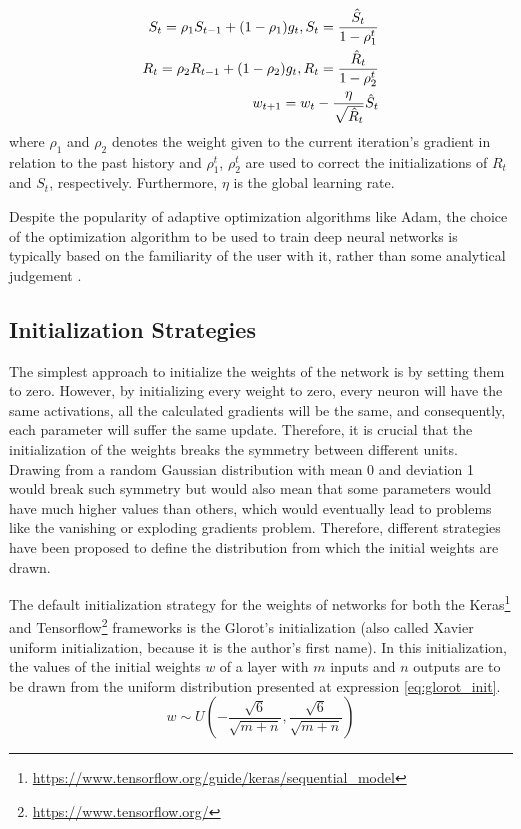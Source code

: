     \begin{equation}
        \centering
        \begin{split}
            S_t = \rho_1 S_{t-1} + (1-\rho_1)g_t, S_t = \frac{\hat{S}_t}{1-\rho^t_1}\\
            R_t = \rho_2 R_{t-1} + (1-\rho_2)g_t, R_t = \frac{\hat{R}_t}{1-\rho^t_2}\\
            w_{t+1} = w_t - \frac{\eta}{\sqrt{\hat{R}_t}} \hat{S}_t  
        \end{split}
        \label{eq:adam}
    \end{equation}  
    where $\rho_1$ and $\rho_2$ denotes the weight given to the current iteration’s gradient in relation to the past history and $\rho_1^t$, $\rho_2^t$ are used to correct the initializations of $R_t$ and $S_t$, respectively. Furthermore, $\eta$ is the global learning rate. \par
    
    Despite the popularity of adaptive optimization algorithms like Adam, the choice of the optimization algorithm to be used to train deep neural networks is typically based on the familiarity of the user with it, rather than some analytical judgement \cite{Goodfellow-et-al-2016}. \par 
    
    \subsection{Initialization Strategies}
    The simplest approach to initialize the weights of the network is by setting them to zero. However, by initializing every weight to zero, every neuron will have the same activations, all the calculated gradients will be the same, and consequently, each parameter will suffer the same update. Therefore, it is crucial that the initialization of the weights breaks the symmetry between different units. Drawing from a random Gaussian distribution with mean 0 and deviation 1 would break such symmetry but would also mean that some parameters would have much higher values than others, which would eventually lead to problems like the vanishing or exploding gradients problem. Therefore, different strategies have been proposed to define the distribution from which the initial weights are drawn. \par
    
    The default initialization strategy for the weights of networks for both the Keras\footnote{\url{https://www.tensorflow.org/guide/keras/sequential_model}} and Tensorflow\footnote{\url{https://www.tensorflow.org/}} frameworks is the Glorot’s initialization \cite{Glorot2010} (also called Xavier uniform initialization, because it is the author's first name). In this initialization, the values of the initial weights $w$ of a layer with $m$ inputs and $n$ outputs are to be drawn from the uniform distribution presented at expression \ref{eq:glorot_init}.
    \begin{equation}
        w \sim U(-\frac{\sqrt{6}}{\sqrt{m+n}}, \frac{\sqrt{6}}{\sqrt{m+n}})
        \label{eq:glorot_init}
    \end{equation}
    
